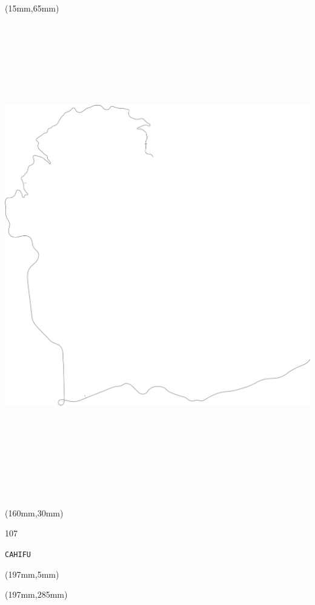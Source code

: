 \begin{textblock*}{185mm}(15mm,65mm)%
\centering
\mbox{\includegraphics[width=185mm,height=210mm,keepaspectratio]{PT/CAHIFU.pdf}}
\end{textblock*}
\begin{textblock*}{40mm}(160mm,30mm)%
\Large
\par{} 
\par107 
\par\hfill\tiny\tt CAHIFU\\
\end{textblock*}
\begin{textblock*}{20mm}(197mm,5mm)%
\fbox{\thepage}
\label{CAHIFU}
\end{textblock*}
\begin{textblock*}{20mm}(197mm,285mm)%
\fbox{\thepage}
\end{textblock*}

